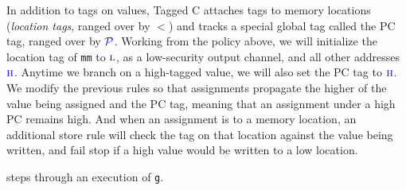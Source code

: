 \documentclass{llncs}
\begin{document}
In addition to tags on values, Tagged C attaches tags to memory locations ({\em location tags}, ranged over by
\(\lt\)) and tracks a special global tag called the PC tag, ranged over by \(\mathcal{\color{blue} P\mathit{}}\).
Working from the policy above, we will initialize the location tag of {\tt mm} to \(\textnormal{\color{blue} \sc l}\),
as a low-security output channel, and all other addresses \(\textnormal{\color{blue} \sc h}\). Anytime we branch on
a high-tagged value, we will also set the PC tag to \(\textnormal{\color{blue} \sc h}\). We modify the previous rules so that
assignments propagate the higher of the value being assigned and the PC tag, meaning that an
assignment under a high PC remains high. And when an assignment is to a memory location, an
additional store rule will check the tag on that location against the value being written,
and fail stop if a high value would be written to a low location.

 steps through an execution of {\tt g}.
\end{document}
